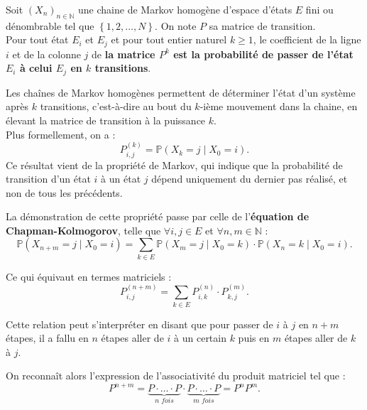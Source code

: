\documentclass{article}
\begin{document}
\begin{tcolorbox}[colback=white,colframe=red!80!black,title=Matrice de transition pour $k$-transitions]
Soit $(X_n)_{n \in \mathbb{N}}$ une chaine de Markov homogène d'espace d'états $E$ fini ou dénombrable tel que $\left\{1,2,\ldots,N\right\}$. On note $P$ sa matrice de transition. \\

Pour tout état $E_i$ et $E_j$ et pour tout entier naturel $k \geq 1$, le coefficient de la ligne $i$ et de la colonne $j$ de \textbf{la matrice $P^k$ est la probabilité de passer de l'état $E_i$ à celui $E_j$ en $k$ transitions}.
\end{tcolorbox}

Les chaînes de Markov homogènes permettent de déterminer l'état d'un système après $k$ transitions, c'est-à-dire au bout du $k$-ième mouvement dans la chaine, en élevant la matrice de transition à la puissance $k$. \\
Plus formellement, on a :
\[
P_{i,j}^{(k)} = \mathbb{P}(X_k = j \mid X_0 = i).
\]
Ce résultat vient de la propriété de Markov, qui indique que la probabilité de transition d'un état $i$ à un état $j$ dépend uniquement du dernier pas réalisé, et non de tous les précédents.

\begin{tcolorbox}[colback=white,colframe=green!80!black,title=Démonstration]
La démonstration de cette propriété passe par celle de l'\textbf{équation de Chapman-Kolmogorov}, telle que $\forall i,j \in E$ et $\forall n,m \in \mathbb{N}$ :
\[
\mathbb{P}(X_{n+m} = j \mid X_0 = i) = \sum_{k \in E} \mathbb{P}(X_{m} = j \mid X_0 = k) \cdot \mathbb{P}(X_n = k \mid X_0 = i).
\]

Ce qui équivaut en termes matriciels :
\[
P_{i,j}^{(n+m)} = \sum_{k \in E} P_{i,k}^{(n)} \cdot P_{k,j}^{(m)}.
\]

Cette relation peut s'interpréter en disant que pour passer de $i$ à $j$ en $n+m$ étapes, 
il a fallu en $n$ étapes aller de $i$ à un certain $k$ puis en $m$ étapes aller de $k$ à $j$. 

On reconnaît alors l'expression de l'associativité du produit matriciel tel que :
\[
P^{n+m} = \underbrace{P \cdot \ldots \cdot P}_\textit{n fois} \cdot \underbrace{P \cdot \ldots \cdot P}_\textit{m fois} = P^{n}P^{m}.
\]
\end{tcolorbox}
\end{document}
